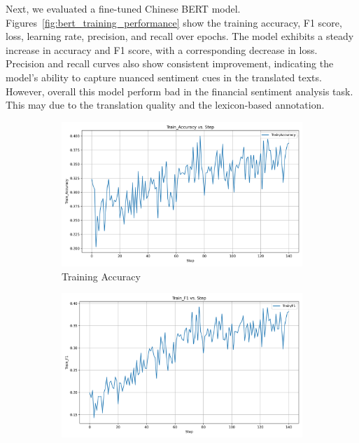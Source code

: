 \documentclass[12pt]{article}
\begin{document}
Next, we evaluated a fine-tuned Chinese BERT model. Figures~\ref{fig:bert_training_performance} show the training accuracy, F1 score, loss, learning rate, precision, and recall over epochs. The model exhibits a steady increase in accuracy and F1 score, with a corresponding decrease in loss. Precision and recall curves also show consistent improvement, indicating the model's ability to capture nuanced sentiment cues in the translated texts. However, overall this model perform bad in the financial sentiment analysis task. This may due to the translation quality and the lexicon-based annotation.

\begin{figure}[!ht]
	\centering
	\begin{subfigure}[b]{0.32\textwidth}
		\includegraphics[width=\linewidth]{BERT_Train_Accuracy.png}
		\caption{Training Accuracy}
	\end{subfigure}
	\hfill
	\begin{subfigure}[b]{0.32\textwidth}
		\includegraphics[width=\linewidth]{BERT_Train_F1.png}

\end{subfigure}
\end{figure}
\end{document}
